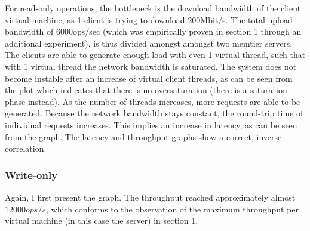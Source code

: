 \documentclass[11pt,a4paper]{article}
\begin{document}
For read-only operations, the bottleneck is the download bandwidth of the client virtual machine,
as 1 client is trying to download 200Mbit/s.
The total upload bandwidth of 6000ops/sec (which was empirically proven in section 1 through an additional experiment), is thus divided amongst amongst two memtier servers.
The clients are able to generate enough load with even 1 virtual thread, such that with 1 virtual thread the network bandwidth is saturated.
The system does not become instable after an increase of virtual client threads, as can be seen from the plot which indicates that there is no oversaturation (there is a saturation phase instead).
As the number of threads increases, more requests are able to be generated.
Because the network bandwidth stays constant, the round-trip time of individual requests increases.
This implies an increase in latency, as can be seen from the graph.
The latency and throughput graphs show a correct, inverse correlation.

\subsubsection{Write-only}

Again, I first present the graph.
The throughput reached approximately almost $12000ops/s$, which conforms to the observation of the maximum throughput per virtual machine (in this case the server) in section 1.
\end{document}

